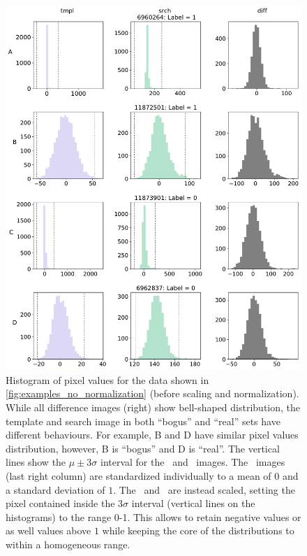 \begin{figure}
    \centering
    \includegraphics[width=0.6\linewidth]{
    figures/histnonorm_new_test_colors.pdf}
    \caption{Histogram of pixel values for %
    the data shown in \autoref{fig:examples_no_normalization} (before scaling and normalization). 
    While all difference images (right) show bell-shaped distribution, the template and search image in both ``bogus'' and ``real'' sets have different behaviours. For example, B and D have similar pixel values distribution, however, B is ``bogus'' and D is ``real''. The vertical lines show the $\mu \pm 3\sigma$ interval for the \search\ and \temp\ images. The \diff\ images (last right column) are standardized individually to a mean of $0$ and a standard deviation of $1$. The \search\ and \temp\ are instead scaled, setting the pixel contained inside the 3$\sigma$ interval (vertical lines on the histograms) to the range 0-1. This allows to retain negative values or as well values above $1$ while keeping the core of the distributions to within a homogeneous range.
               }
    \label{fig:histobeforenormalizarion}
\end{figure}


